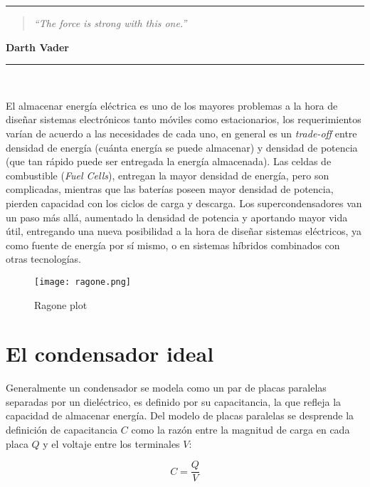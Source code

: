\noindent
\rule{\linewidth}{1 pt}
\begin{flushright}
	\begin{quotation}
		\small{
			\textit{``The force is strong with this one.''}}
	\end{quotation}
	\bf{Darth Vader}
\end{flushright}
\noindent
\rule{\linewidth}{1 pt}\\
\vfill

El almacenar energía eléctrica es uno de los mayores problemas a la hora de diseñar sistemas electrónicos tanto móviles como estacionarios, los requerimientos varían de acuerdo a las necesidades de cada uno, en general es un \textit{trade-off} entre densidad de energía (cuánta energía se puede almacenar) y densidad de potencia (que tan rápido puede ser entregada la energía almacenada). Las celdas de combustible (\textit{Fuel Cells}), entregan la mayor densidad de energía, pero son complicadas, mientras que las baterías poseen mayor densidad de potencia, pierden capacidad con los ciclos de carga y descarga. Los supercondensadores van un paso más allá, aumentado la densidad de potencia y aportando mayor vida útil, entregando una nueva posibilidad a la hora de diseñar sistemas eléctricos, ya como fuente de energía por sí mismo, o en sistemas híbridos combinados con otras tecnologías\citep{Thounthong2009}.

\begin{figure}
	\centering
	\texttt{[image: ragone.png]}
	\label{fig:ragone}
	\caption{Ragone plot}
\end{figure}

\section{El condensador ideal}
Generalmente un condensador se modela como un par de placas paralelas separadas por un dieléctrico, es definido por su capacitancia, la que refleja la capacidad de almacenar energía. Del modelo de placas paralelas se desprende la definición de capacitancia $C$ como la razón entre la magnitud de carga en cada placa $Q$ y el voltaje entre los terminales $V$:

\begin{equation}
	C = \frac{Q}{V}
\end{equation}

